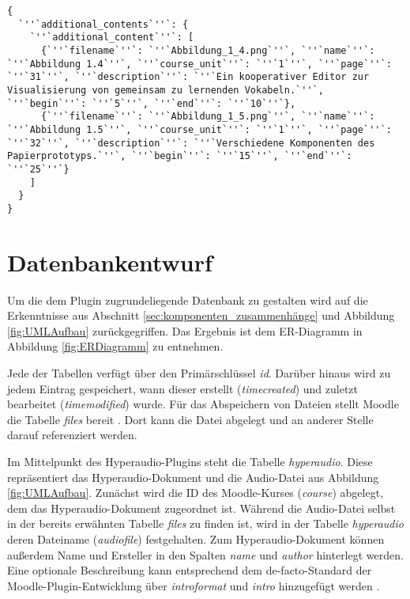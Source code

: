 \begin{lstlisting}[basicstyle=\small,
             inputencoding={utf8}, 
             extendedchars=false,
             commentstyle=\color{black}, 
             keywordstyle=\color{black}, 
             escapeinside=``,
             linewidth=\textwidth,
             caption={Beispielhafte \textit{JSON}-Datei},
             label={lst:JSON}]             
{
  `''`additional_contents`''`: {
    `''`additional_content`''`: [
      {`''`filename`''`: `''`Abbildung_1_4.png`''`, `''`name`''`: `''`Abbildung 1.4`''`, `''`course_unit`''`: `''`1`''`, `''`page`''`: `''`31`''`, `''`description`''`: `''`Ein kooperativer Editor zur Visualisierung von gemeinsam zu lernenden Vokabeln.`''`, `''`begin`''`: `''`5`''`, `''`end`''`: `''`10`''`},
      {`''`filename`''`: `''`Abbildung_1_5.png`''`, `''`name`''`: `''`Abbildung 1.5`''`, `''`course_unit`''`: `''`1`''`, `''`page`''`: `''`32`''`, `''`description`''`: `''`Verschiedene Komponenten des Papierprototyps.`''`, `''`begin`''`: `''`15`''`, `''`end`''`: `''`25`''`}
    ]
  }
}
\end{lstlisting}

\section{Datenbankentwurf}
Um die dem Plugin zugrundeliegende Datenbank zu gestalten wird auf die Erkenntnisse aus Abschnitt \ref{sec:komponenten_zusammenhänge} und Abbildung \ref{fig:UMLAufbau} zurückgegriffen. Das Ergebnis ist dem ER-Diagramm in Abbildung \ref{fig:ERDiagramm} zu entnehmen.

Jede der Tabellen verfügt über den Primärschlüssel \textit{id}. Darüber hinaus wird zu jedem Eintrag gespeichert, wann dieser erstellt (\textit{timecreated}) und zuletzt bearbeitet (\textit{timemodified}) wurde. Für das Abspeichern von Dateien stellt Moodle die Tabelle \textit{files} bereit \citep{moodle2018file}. Dort kann die Datei abgelegt und an anderer Stelle darauf referenziert werden.

Im Mittelpunkt des Hyperaudio-Plugins steht die Tabelle \textit{hyperaudio}. Diese repräsentiert das Hyperaudio-Dokument und die Audio-Datei aus Abbildung \ref{fig:UMLAufbau}. Zunächst wird die ID des Moodle-Kurses (\textit{course}) abgelegt, dem das Hyperaudio-Dokument zugeordnet ist. Während die Audio-Datei selbst in der bereits erwähnten Tabelle \textit{files} zu finden ist, wird in der Tabelle \textit{hyperaudio} deren Dateiname (\textit{audiofile}) festgehalten. Zum Hyperaudio-Dokument können außerdem Name und Ersteller in den Spalten \textit{name} und \textit{author} hinterlegt werden. Eine optionale Beschreibung kann entsprechend dem de-facto-Standard der Moodle-Plugin-Entwicklung über \textit{introformat} und \textit{intro} hinzugefügt werden \citep{moodle2016activity}.

